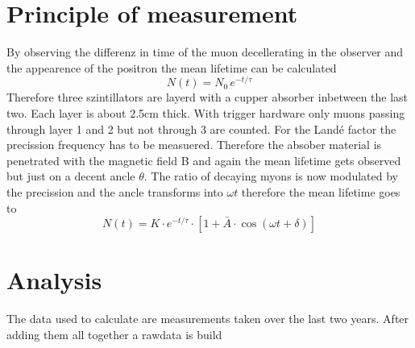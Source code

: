 \documentclass{include/thesisclass3}
\begin{document}
\section{Principle of measurement}
By observing the differenz in time of the muon decellerating in the observer and the appearence of the positron the mean lifetime can be calculated
\begin{equation}
N(t)=N_0\,e^{-t/\tau}
\end{equation}
Therefore three szintillators are layerd with a cupper absorber inbetween the last two. Each layer is about 2.5cm thick. With trigger hardware only muons passing through layer 1 and 2 but not through 3 are counted. 
For the Landé factor the precission frequency has to be measuered. Therefore the absober material is penetrated with the magnetic field B and again the mean lifetime gets observed but just on a decent ancle $\theta$. The ratio of decaying myons is now modulated by the precission and the ancle transforms into $\omega t$ therefore the mean lifetime goes to 
\begin{equation}
N(t)=K\cdot e^{ -t/\tau } \cdot [ 1+\bar A \cdot \cos(\omega t + \delta )]\label{n(t)}
\end{equation}

\section{Analysis}
The data used to calculate are measurements taken over the last two years. After adding them all together a rawdata is build
\end{document}
